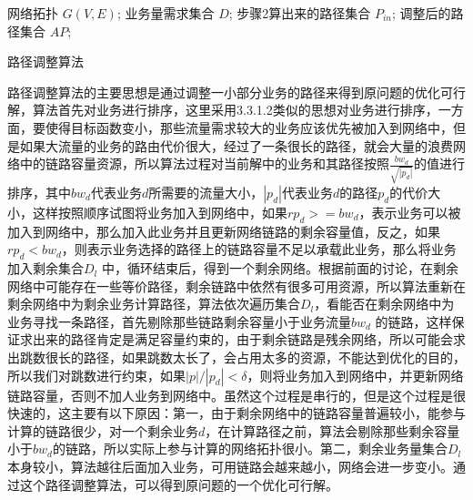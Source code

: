 \begin{algorithm}[t]
\begin{algorithmic}[1]
\Require
网络拓扑 $G(V, E)$;
业务量需求集合 $D$;
步骤2算出来的路径集合 $P_{in}$;
\Ensure
调整后的路径集合 $AP$;
\Else
{}
\EndIf
\EndFor
{}
\EndIf
\EndFor
{}
\EndIf
\EndFor
\end{algorithmic}
\caption{路径调整算法}
\label{PathAdj}
\end{algorithm}

路径调整算法的主要思想是通过调整一小部分业务的路径来得到原问题的优化可行解，算法首先对业务进行排序，这里采用3.3.1.2类似的思想对业务进行排序，一方面，要使得目标函数变小，那些流量需求较大的业务应该优先被加入到网络中，但是如果大流量的业务的路由代价很大，经过了一条很长的路径，就会大量的浪费网络中的链路容量资源，所以算法过程对当前解中的业务和其路径按照$\frac{bw_d}{\sqrt{|p_d|}}$的值进行排序，其中${bw_d}$代表业务$d$所需要的流量大小，$|p_d|$代表业务$d$的路径$p_d$的代价大小，这样按照顺序试图将业务加入到网络中，如果$rp_d>=bw_d$，表示业务可以被加入到网络中，那么加入此业务并且更新网络链路的剩余容量值，反之，如果$rp_d<bw_d$，则表示业务选择的路径上的链路容量不足以承载此业务，那么将业务加入剩余集合$D_l$ 中，循环结束后，得到一个剩余网络。根据前面的讨论，在剩余网络中可能存在一些等价路径，剩余链路中依然有很多可用资源，所以算法重新在剩余网络中为剩余业务计算路径，算法依次遍历集合$D_l$，看能否在剩余网络中为业务寻找一条路径，首先剔除那些链路剩余容量小于业务流量$bw_d$ 的链路，这样保证求出来的路径肯定是满足容量约束的，由于剩余链路是残余网络，所以可能会求出跳数很长的路径，如果跳数太长了，会占用太多的资源，不能达到优化的目的，所以我们对跳数进行约束，如果$|p|/|p_d|<\delta$，则将业务加入到网络中，并更新网络链路容量，否则不加人业务到网络中。虽然这个过程是串行的，但是这个过程是很快速的，这主要有以下原因：第一，由于剩余网络中的链路容量普遍较小，能参与计算的链路很少，对一个剩余业务$d$，在计算路径之前，算法会剔除那些剩余容量小于$bw_d$的链路，所以实际上参与计算的网络拓扑很小。第二，剩余业务量集合$D_l$本身较小，算法越往后面加入业务，可用链路会越来越小，网络会进一步变小。通过这个路径调整算法，可以得到原问题的一个优化可行解。
